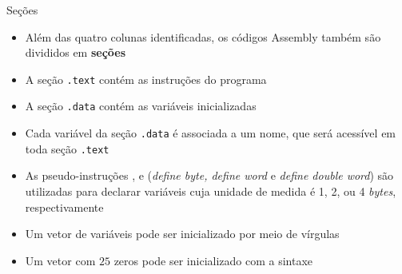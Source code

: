 \begin{frame}[fragile]{Seções}

    \begin{itemize}
        \item Além das quatro colunas identificadas, os códigos Assembly também são divididos
            em \textbf{seções}

        \item A seção \texttt{.text} contém as instruções do programa

        \item A seção \texttt{.data} contém as variáveis inicializadas

        \item Cada variável da seção \texttt{.data} é associada a um nome, que será
            acessível em toda seção \texttt{.text}

        \item As pseudo-instruções ,  e  
            (\textit{define byte, define word} e \textit{define double word}) são 
            utilizadas para declarar variáveis cuja unidade de medida é 1, 2, ou 4 \textit{bytes},
            respectivamente

        \item Um vetor de variáveis pode ser inicializado por meio de vírgulas


        \item Um vetor com $25$ zeros pode ser inicializado com a sintaxe


    \end{itemize}

\end{frame}

